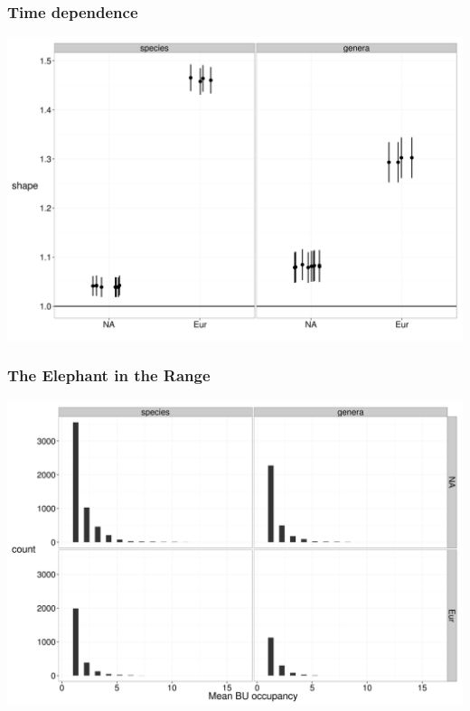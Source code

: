 \documentclass{beamer}
\begin{document}
\begin{frame}
  \frametitle{Time dependence}

  \includegraphics[height=0.8\textheight,width=\textwidth,keepaspectratio=true]{figure/shape_est}

\end{frame}

\begin{frame}
  \frametitle{The Elephant in the Range}

  \includegraphics[height=0.8\textheight,width=\textwidth,keepaspectratio=true]{figure/occ_dist}

\end{frame}
\end{document}
